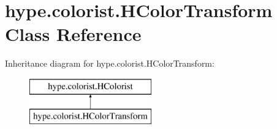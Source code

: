 \hypertarget{classhype_1_1colorist_1_1_h_color_transform}{\section{hype.\-colorist.\-H\-Color\-Transform Class Reference}
\label{classhype_1_1colorist_1_1_h_color_transform}
}
Inheritance diagram for hype.\-colorist.\-H\-Color\-Transform\-:\begin{figure}[H]
\begin{center}
\leavevmode
\includegraphics[height=2.000000cm]{classhype_1_1colorist_1_1_h_color_transform}
\end{center}
\end{figure}

